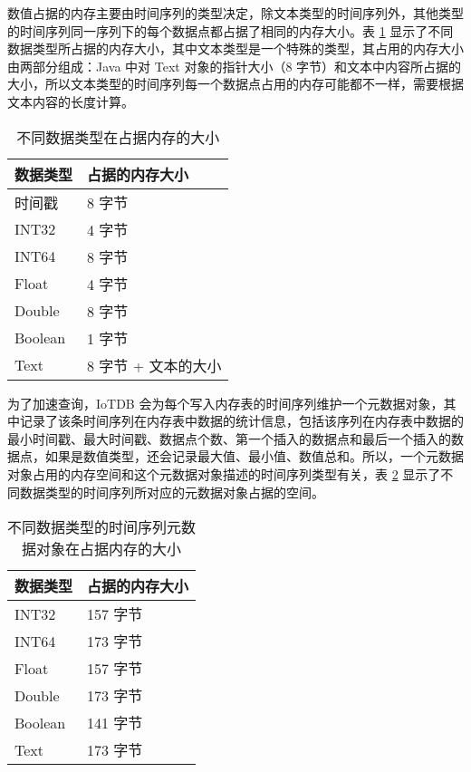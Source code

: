 数值占据的内存主要由时间序列的类型决定，除文本类型的时间序列外，其他类型的时间序列同一序列下的每个数据点都占据了相同的内存大小。表 \ref{fig:data-type-mem-size} 显示了不同数据类型所占据的内存大小，其中文本类型是一个特殊的类型，其占用的内存大小由两部分组成：Java 中对 Text 对象的指针大小（8 字节）和文本中内容所占据的大小，所以文本类型的时间序列每一个数据点占用的内存可能都不一样，需要根据文本内容的长度计算。
\begin{table}
  \centering
  \caption{不同数据类型在占据内存的大小}
  \begin{tabular}{ll}
    \toprule
    数据类型 & 占据的内存大小 \\
    \midrule
    时间戳 & 8 字节 \\
    INT32 & 4 字节 \\
    INT64 & 8 字节 \\
    Float & 4 字节 \\
    Double & 8 字节\\
    Boolean & 1 字节 \\
    Text & 8 字节 + 文本的大小 \\
    \bottomrule
  \end{tabular}
  \label{fig:data-type-mem-size}
\end{table}

为了加速查询，IoTDB 会为每个写入内存表的时间序列维护一个元数据对象，其中记录了该条时间序列在内存表中数据的统计信息，包括该序列在内存表中数据的最小时间戳、最大时间戳、数据点个数、第一个插入的数据点和最后一个插入的数据点，如果是数值类型，还会记录最大值、最小值、数值总和。所以，一个元数据对象占用的内存空间和这个元数据对象描述的时间序列类型有关，表 \ref{fig:data-type-statistic-mem-size} 显示了不同数据类型的时间序列所对应的元数据对象占据的空间。

\begin{table}
  \centering
  \caption{不同数据类型的时间序列元数据对象在占据内存的大小}
  \begin{tabular}{ll}
    \toprule
    数据类型 & 占据的内存大小 \\
    \midrule
    INT32 & 157 字节 \\
    INT64 & 173 字节 \\
    Float & 157 字节 \\
    Double & 173 字节\\
    Boolean & 141 字节 \\
    Text & 173 字节 \\
    \bottomrule
  \end{tabular}
  \label{fig:data-type-statistic-mem-size}
\end{table}

